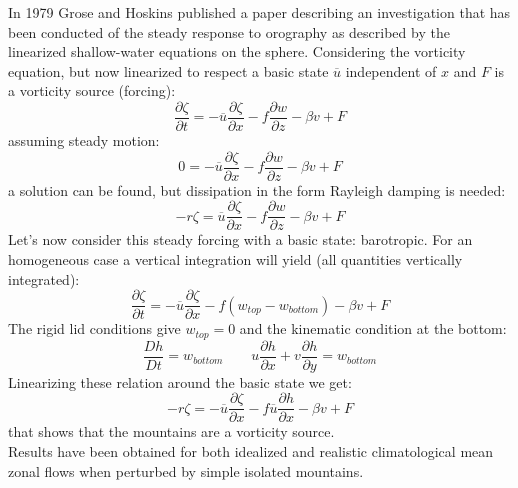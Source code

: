 In 1979 Grose and Hoskins\cite{grose78} published a paper describing an investigation that has been conducted of the steady response to orography as described by the linearized shallow-water equations on the sphere. Considering the vorticity equation, but now linearized to respect a basic state $\overline{u}$ independent of $x$ and $F$ is a vorticity source (forcing):
\begin{equation}\label{eq.vortlinearized}
    \frac{\partial\zeta}{\partial t}=-\overline{u}\frac{\partial\zeta}{\partial x}-f\frac{\partial w}{\partial z}-\beta v+F
\end{equation}
assuming steady motion: 
\begin{equation}
    0=-\overline{u}\frac{\partial\zeta}{\partial x}-f\frac{\partial w}{\partial z}-\beta v+F
    \end{equation}
    a solution can be found, but dissipation in the form Rayleigh damping is needed:
    \begin{equation}
        -r\zeta=\overline{u}\frac{\partial\zeta}{\partial x}-f\frac{\partial w}{\partial z}-\beta v+F
    \end{equation}
    Let's now consider this steady forcing with a basic state: barotropic. For an homogeneous case a vertical integration will yield (all quantities vertically integrated): 
    \begin{equation}
        \frac{\partial\zeta}{\partial t}=-\overline{u}\frac{\partial\zeta}{\partial x}-f(w_{top}-w_{bottom})-\beta v+F
    \end{equation}
    The rigid lid conditions give $w_{top}=0$ and the kinematic condition at the bottom: 
    $$\frac{Dh}{Dt}=w_{bottom}\qquad u\frac{\partial h}{\partial x}+v\frac{\partial h}{\partial y}=w_{bottom}$$
Linearizing these relation around the basic state we get: 
\begin{equation}
   - r\zeta=-\overline{u}\frac{\partial\zeta}{\partial x}-f\overline{u}\frac{\partial h}{\partial x}-\beta v+F
\end{equation}
that shows that the mountains are a vorticity source. \\

Results have been obtained for both idealized and realistic climatological mean zonal flows when perturbed by simple isolated mountains. 

